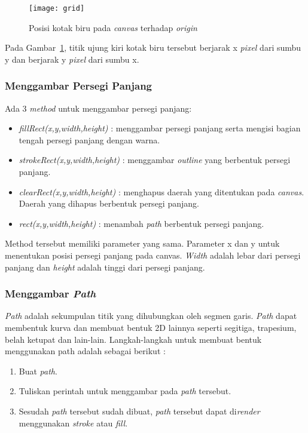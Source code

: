 \begin{figure}[H]
	\centering  
	\texttt{[image: grid]}
	\caption[Posisi kotak biru pada \textit{canvas} terhadap \textit{origin}]{Posisi kotak biru pada \textit{canvas} terhadap \textit{origin}\cite{MDN:05:Web}}
	\label{fig:grid} 
\end{figure} 

Pada Gambar~\ref{fig:grid}, titik ujung kiri kotak biru tersebut berjarak x \textit{pixel} dari sumbu y dan berjarak y \textit{pixel} dari sumbu x. 

\subsubsection{Menggambar Persegi Panjang}
Ada 3 \textit{method} untuk menggambar persegi panjang:

\begin{itemize}
	\item \textit{fillRect(x,y,width,height)} : menggambar persegi panjang serta mengisi bagian tengah persegi panjang dengan warna.
	\item \textit{strokeRect(x,y,width,height)} : menggambar \textit{outline} yang berbentuk persegi panjang.
	\item \textit{clearRect(x,y,width,height)} : menghapus daerah yang ditentukan pada \textit{canvas}. Daerah yang dihapus berbentuk persegi panjang.
	\item \textit{rect(x,y,width,height)} : menambah \textit{path} berbentuk persegi panjang.
\end{itemize}

Method tersebut memiliki parameter yang sama. Parameter x dan y untuk menentukan posisi persegi panjang pada canvas. \textit{Width} adalah lebar dari persegi panjang dan \textit{height} adalah tinggi dari persegi panjang.

\subsubsection{Menggambar \textit{Path}}
\textit{Path} adalah sekumpulan titik yang dihubungkan oleh segmen garis. \textit{Path} dapat membentuk kurva dan membuat bentuk 2D lainnya seperti segitiga, trapesium, belah ketupat dan lain-lain. Langkah-langkah untuk membuat bentuk menggunakan path adalah sebagai berikut : 

\begin{enumerate}
	\item Buat \textit{path}.
	\item Tuliskan perintah untuk menggambar pada \textit{path} tersebut.
	\item Sesudah \textit{path} tersebut sudah dibuat, \textit{path} tersebut dapat di\textit{render} menggunakan \textit{stroke} atau \textit{fill}.
\end{enumerate}

